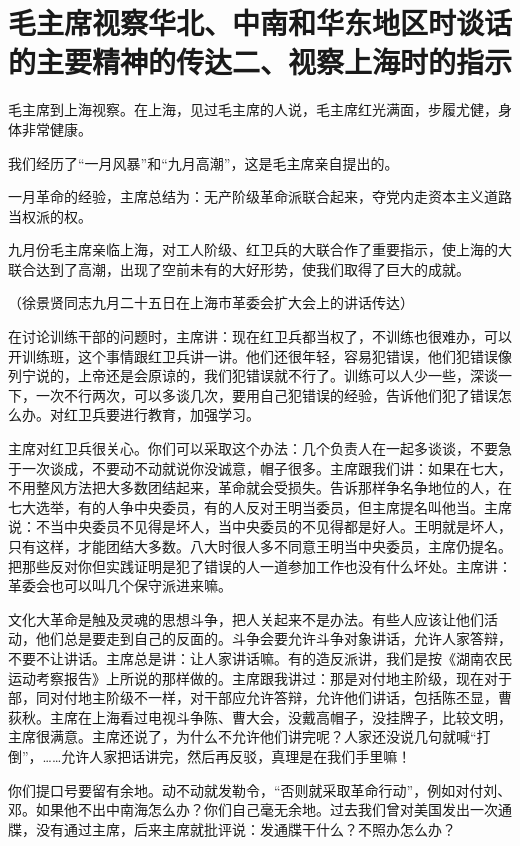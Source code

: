 \section[毛主席视察华北、中南和华东地区时谈话的主要精神的传达二、视察上海时的指示]{毛主席视察华北、中南和华东地区时谈话的主要精神的传达二、视察上海时的指示}


毛主席到上海视察。在上海，见过毛主席的人说，毛主席红光满面，步履尤健，身体非常健康。

我们经历了“一月风暴”和“九月高潮”，这是毛主席亲自提出的。

一月革命的经验，主席总结为：无产阶级革命派联合起来，夺党内走资本主义道路当权派的权。

九月份毛主席亲临上海，对工人阶级、红卫兵的大联合作了重要指示，使上海的大联合达到了高潮，出现了空前未有的大好形势，使我们取得了巨大的成就。

{\raggedleft （徐景贤同志九月二十五日在上海市革委会扩大会上的讲话传达）\par}

在讨论训练干部的问题时，主席讲：现在红卫兵都当权了，不训练也很难办，可以开训练班，这个事情跟红卫兵讲一讲。他们还很年轻，容易犯错误，他们犯错误像列宁说的，上帝还是会原谅的，我们犯错误就不行了。训练可以人少一些，深谈一下，一次不行两次，可以多谈几次，要用自己犯错误的经验，告诉他们犯了错误怎么办。对红卫兵要进行教育，加强学习。

主席对红卫兵很关心。你们可以采取这个办法：几个负责人在一起多谈谈，不要急于一次谈成，不要动不动就说你没诚意，帽子很多。主席跟我们讲：如果在七大，不用整风方法把大多数团结起来，革命就会受损失。告诉那样争名争地位的人，在七大选举，有的人争中央委员，有的人反对王明当委员，但主席提名叫他当。主席说：不当中央委员不见得是坏人，当中央委员的不见得都是好人。王明就是坏人，只有这样，才能团结大多数。八大时很人多不同意王明当中央委员，主席仍提名。把那些反对你但实践证明是犯了错误的人一道参加工作也没有什么坏处。主席讲：革委会也可以叫几个保守派进来嘛。

文化大革命是触及灵魂的思想斗争，把人关起来不是办法。有些人应该让他们活动，他们总是要走到自己的反面的。斗争会要允许斗争对象讲话，允许人家答辩，不要不让讲话。主席总是讲：让人家讲话嘛。有的造反派讲，我们是按《湖南农民运动考察报告》上所说的那样做的。主席跟我讲过：那是对付地主阶级，现在对于部，同对付地主阶级不一样，对干部应允许答辩，允许他们讲话，包括陈丕显，曹荻秋。主席在上海看过电视斗争陈、曹大会，没戴高帽子，没挂牌子，比较文明，主席很满意。主席还说了，为什么不允许他们讲完呢？人家还没说几句就喊“打倒”，……允许人家把话讲完，然后再反驳，真理是在我们手里嘛！

你们提口号要留有余地。动不动就发勒令，“否则就采取革命行动”，例如对付刘、邓。如果他不出中南海怎么办？你们自己毫无余地。过去我们曾对美国发出一次通牒，没有通过主席，后来主席就批评说：发通牒干什么？不照办怎么办？

